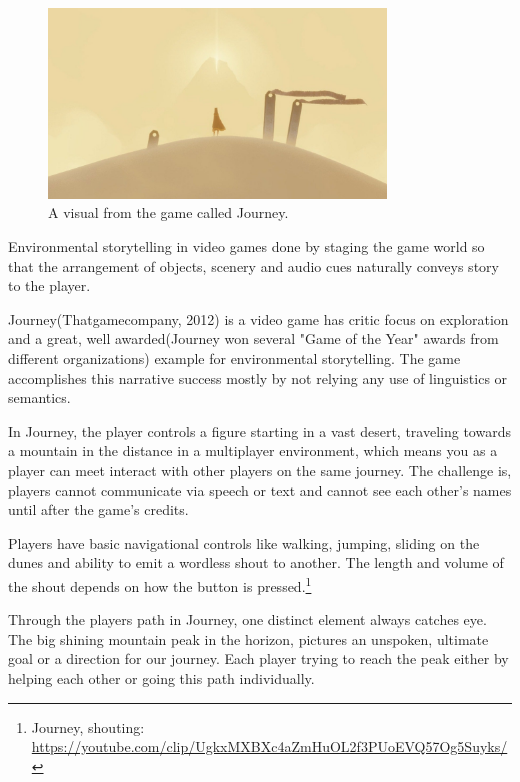             \begin{figure}[H]
                \centering
                \includegraphics[width=0.8\textwidth]{images/journey.jpg}
                \caption{A visual from the game called Journey.}
                \label{fig:JOURNEY}
            \end{figure}

            Environmental storytelling in video games done by staging the game world so that the arrangement of objects, scenery and audio cues naturally conveys story to the player\cite{BioShock_Infinite}.\par

            Journey(Thatgamecompany, 2012) is a video game has critic focus on exploration and a great, well awarded(Journey won several "Game of the Year" awards from different organizations) example for environmental storytelling. The game accomplishes this narrative success mostly by not relying any use of linguistics or semantics.\par

            In Journey, the player controls a figure starting in a vast desert, traveling towards a mountain in the distance in a multiplayer environment, which means you as a player can meet interact with other players on the same journey. The challenge is, players cannot communicate via speech or text and cannot see each other's names until after the game's credits.\par

            Players have basic navigational controls like walking, jumping, sliding on the dunes and ability to emit a wordless shout to another. The length and volume of the shout depends on how the button is pressed.\footnote{Journey, shouting: \url{https://youtube.com/clip/UgkxMXBXc4aZmHuOL2f3PUoEVQ57Og5Suyks/}}\par

            Through the players path in Journey, one distinct element always catches eye. The big shining mountain peak in the horizon, pictures an unspoken, ultimate goal or a direction for our journey. Each player trying to reach the peak either by helping each other or going this path individually.\par


